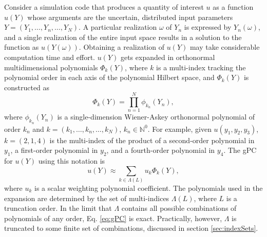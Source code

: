 Consider a simulation code that produces a quantity of interest $u$ as a function $u(Y)$ whose arguments are
the uncertain, distributed input
parameters $Y=(Y_1,\ldots,Y_n,\ldots,Y_N)$.  A particular realization $\omega$ of $Y_n$ is expressed by
$Y_n(\omega)$, and a single realization of the entire input space results in a solution to the function as
$u(Y(\omega))$. Obtaining a realization of $u(Y)$ may take considerable computation time and
effort.
$u(Y)$ gets expanded in orthonormal multidimensional polynomials $\Phi_k(Y)$, where $k$ is a multi-index tracking
the polynomial order in each axis of the polynomial Hilbert space, and $\Phi_k(Y)$ is constructed as
\begin{equation}\label{eq:gPC}
  \Phi_k(Y) = \prod_{n=1}^N \phi_{k_n}(Y_n),
\end{equation}
where $\phi_{k_n}(Y_n)$ is a single-dimension Wiener-Askey orthonormal polynomial of order $k_n$ and
$k=(k_1,\ldots,k_n,\ldots,k_N)$, $k_n\in\mathbb{N}^0$.  For example, given $u(y_1,y_2,y_3)$, $k=(2,1,4)$
is the multi-index of the
product of a second-order polynomial in $y_1$, a first-order polynomial in $y_2$, and a fourth-order
polynomial in $y_4$. The gPC for $u(Y)$ using this notation is
\begin{equation}
  u(Y) \approx \sum_{k\in\Lambda(L)} u_k\Phi_k(Y),
\end{equation}
where $u_k$ is a scalar weighting polynomial coefficient. The polynomials used in the expansion are determined
by the set of multi-indices $\Lambda(L)$, where $L$ is a truncation order.  In the limit
that $\Lambda$ contains all possible combinations of polynomials of any order, Eq. \ref{eq:gPC} is exact.
Practically, however, $\Lambda$ is truncated to some finite set of combinations, discussed in section
\ref{sec:indexSets}.


